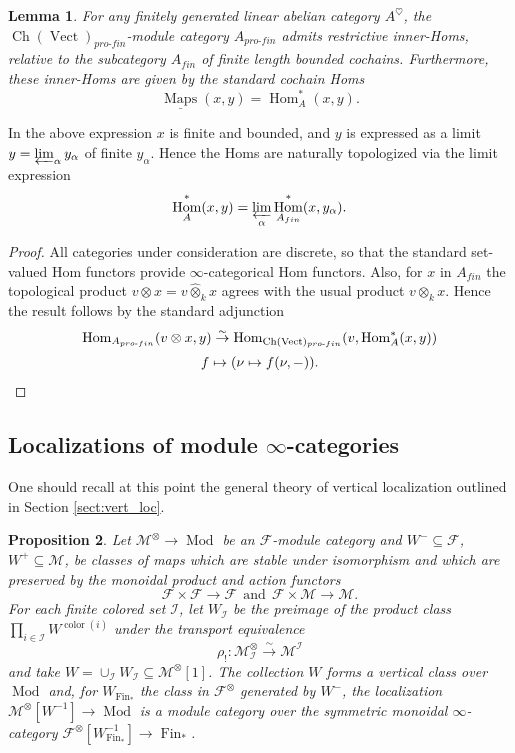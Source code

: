 \documentclass[reqno]{amsart}
\newtheorem{lemma}{Lemma}[section]
\newtheorem{proposition}[lemma]{Proposition}
\theoremstyle{definition}
\newcommand{\mcl}[1]{\mathcal{#1}}
\newcommand{\msc}[1]{\mathscr{#1}}
\newcommand{\opn}[1]{\operatorname{#1}}
\newcommand{\ot}{\otimes}
\newcommand{\pf}{pro\text{-}fin}
\DeclareMathOperator{\Hom}{Hom}
\DeclareMathOperator{\Fin}{Fin}
\DeclareMathOperator{\Maps}{Maps}
\renewcommand{\1}{\mathbf{1}}
\renewcommand{\hat}{\widehat}
\begin{document}
\begin{lemma}\label{lem:a_innhom}
For any finitely generated linear abelian category $A^{\heartsuit}$, the $\opn{Ch}(\opn{Vect})_{\pf}$-module category $A_{\pf}$ admits restrictive inner-Homs, relative to the subcategory $A_{fin}$ of finite length bounded cochains.  Furthermore, these inner-Homs are given by the standard cochain Homs
\[
\underline{\Maps}(x,y)=\Hom^{\ast}_{A}(x,y).
\]
\end{lemma}

In the above expression $x$ is finite and bounded, and $y$ is expressed as a limit $y=\varprojlim_{\alpha}y_{\alpha}$ of finite $y_{\alpha}$. Hence the Homs are naturally topologized via the limit expression
\[
\Hom^{\ast}_{A}(x,y)=\varprojlim_{\alpha}\Hom^{\ast}_{A_{fin}}(x,y_{\alpha}).
\]

\begin{proof}
All categories under consideration are discrete, so that the standard set-valued Hom functors provide $\infty$-categorical Hom functors.  Also, for $x$ in $A_{fin}$ the topological product $v\ot x=v\hat{\ot}_kx$ agrees with the usual product $v\ot_k x$.  Hence the result follows by the standard adjunction
\[
\begin{array}{c}
\Hom_{A_{\pf}}(v\ot x,y)\overset{\sim}\to \Hom_{\opn{Ch}(\opn{Vect})_{\pf}}(v,\Hom^{\ast}_{A}(x,y))\vspace{2mm}\\
f\mapsto (\nu\mapsto f(\nu,-)).
\end{array}
\]
\end{proof}

\subsection{Localizations of module $\infty$-categories}

One should recall at this point the general theory of vertical localization outlined in Section \ref{sect:vert_loc}.

\begin{proposition}\label{prop:mod_loc}
Let $\msc{M}^{\ot}\to \opn{Mod}$ be an $\msc{F}$-module category and $W^-\subseteq \msc{F}$, $W^+\subseteq \msc{M}$, be classes of maps which are stable under isomorphism and which are preserved by the monoidal product and action functors
\[
\msc{F}\times\msc{F}\to \msc{F}\ \ \text{and}\ \ \msc{F}\times\msc{M}\to \msc{M}.
\]
For each finite colored set $\mcl{I}$, let $W_{\mcl{I}}$ be the preimage of the product class $\prod_{i\in \mcl{I}}W^{\opn{color}(i)}$ under the transport equivalence
\begin{equation}\label{eq:3381}
\rho_!:\msc{M}^{\ot}_{\mcl{I}}\overset{\sim}\to \msc{M}^\mcl{I}
\end{equation}
and take $W=\cup_{\mcl{I}}W_{\mcl{I}}\subseteq \msc{M}^{\ot}[1]$.  The collection $W$ forms a vertical class over $\opn{Mod}$ and, for $W_{\Fin_{\ast}}$ the class in $\msc{F}^{\ot}$ generated by $W^{-}$, the localization $\msc{M}^{\ot}[W^{-1}]\to \opn{Mod}$ is a module category over the symmetric monoidal $\infty$-category $\msc{F}^{\ot}[W_{\Fin_{\ast}}^{-1}]\to \Fin_{\ast}$.
\end{proposition}
\end{document}
